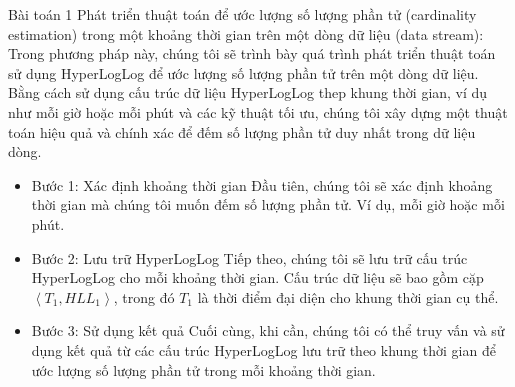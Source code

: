 \documentclass[10pt]{beamer}
\begin{document}
\begin{frame}[fragile]{Bài toán 1}
Phát triển thuật toán để ước lượng số lượng phần tử (cardinality estimation) trong một khoảng thời gian trên một dòng dữ liệu (data stream):
Trong phương pháp này, chúng tôi sẽ trình bày quá trình phát triển thuật toán sử dụng HyperLogLog để ước lượng 
số lượng phần tử trên một dòng dữ liệu. Bằng cách sử dụng cấu trúc dữ liệu HyperLogLog thep khung thời gian, ví dụ như mỗi giờ hoặc mỗi phút và các kỹ thuật tối ưu, 
chúng tôi xây dựng một thuật toán hiệu quả và chính xác để đếm số lượng phần tử duy nhất trong dữ liệu dòng.
\begin{itemize}
    \item Bước 1: Xác định khoảng thời gian
    Đầu tiên, chúng tôi sẽ xác định khoảng thời gian mà chúng tôi muốn đếm số lượng phần tử. Ví dụ, mỗi giờ hoặc mỗi phút.
    \item Bước 2: Lưu trữ HyperLogLog
    Tiếp theo, chúng tôi sẽ lưu trữ cấu trúc HyperLogLog cho mỗi khoảng thời gian. Cấu trúc dữ liệu sẽ bao gồm cặp $\left< T_1, HLL_1\right>$, 
    trong đó $T_1$ là thời điểm đại diện cho khung thời gian cụ thể.
    \item Bước 3: Sử dụng kết quả
    Cuối cùng, khi cần, chúng tôi có thể truy vấn và sử dụng kết quả từ các cấu trúc HyperLogLog lưu trữ theo khung thời gian để 
    ước lượng số lượng phần tử trong mỗi khoảng thời gian.
\end{itemize}
\end{frame}
\end{document}
